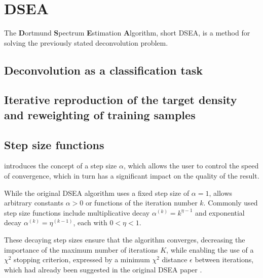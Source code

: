 \section{DSEA} %
The \textbf{D}ortmund \textbf{S}pectrum \textbf{E}stimation \textbf{A}lgorithm,
  short DSEA,
is a method for solving the previously stated deconvolution problem.

\subsection{Deconvolution as a classification task} %
\blindtext[2]

\subsection{Iterative reproduction of the target density and reweighting of training samples} %
\blindtext[5]

\subsection{Step size functions} \label{sec:dsea:dsea:stepsize}
\dseaplus introduces the concept of a step size $\alpha$,
which allows the user to control the speed of convergence,
which in turn has a significant impact on the quality of the result.

While the original DSEA algorithm uses a fixed step size of $\alpha = 1$,
\dseaplus allows arbitrary constants $\alpha > 0$
or functions of the iteration number $k$.
Commonly used step size functions include
multiplicative decay
  $\alpha^{(k)} = k^{\eta - 1}$
and exponential decay
  $\alpha^{(k)} = \eta^{(k - 1)}$,
each with $0 < \eta < 1$.

These decaying step sizes ensure that the algorithm converges,
decreasing the importance of the maximum number of iterations $K$,
while enabling the use of a $\chi^2$ stopping criterion,
  expressed by a minimum $\chi^2$ distance $\epsilon$ between iterations,
  which had already been suggested in the original DSEA paper \cite{dsea_tim}.


